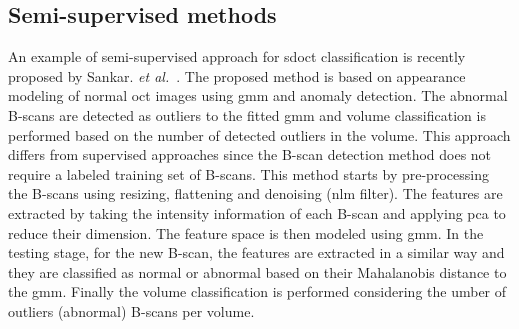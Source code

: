 


\subsection{Semi-supervised methods}
An example of semi-supervised approach for \gls{sdoct} classification is recently proposed by Sankar. \textit{et al.}~\cite{sankar2016classification}. 
The proposed method is based on appearance modeling of normal \gls{oct} images using \gls{gmm} and anomaly detection. 
The abnormal B-scans are detected as outliers to the fitted \gls{gmm} and volume classification is performed based on the number of detected outliers in the volume. 
This approach differs from supervised approaches since the B-scan detection method does not require a labeled training set of B-scans. 
This method starts by pre-processing the B-scans using resizing, flattening and denoising (\gls{nlm} filter).
The features are extracted by taking the intensity information of each B-scan and applying \gls{pca} to reduce their dimension.
The feature space is then modeled using \gls{gmm}. 
In the testing stage, for the new B-scan, the features are extracted in a similar way and they are classified as normal or abnormal based on their Mahalanobis distance to the \gls{gmm}. 
Finally the volume classification is performed considering the umber of outliers (abnormal) B-scans per volume. 

